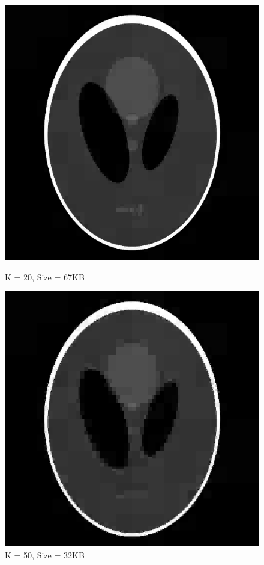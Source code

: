 \documentclass{article}
\begin{document}
    \pagebreak
    
    \begin{figure}[!htb]
      \includegraphics[scale=0.4]{./compression/2/20.png}
      \caption{K = 20, Size = 67KB}
    \endminipage \hfill
      \includegraphics[scale=.4]{./compression/2/50.png}
      \caption{K = 50, Size = 32KB}
    \endminipage
    \end{figure}
    
\end{document}
